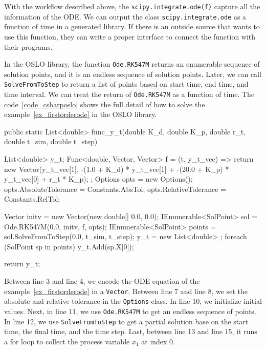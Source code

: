 With the workflow described above, the \verb|scipy.integrate.ode(f)| capture all the information of the ODE. We can output the class \verb|scipy.integrate.ode| as a function of time in a generated library. If there is an outside source that wants to use this function, they can write a proper interface to connect the function with their programs. 

In the OSLO library, the function \verb|Ode.RK547M| returns an enumerable sequence of solution points, and it is an endless sequence of solution points. Later, we can call \verb|SolveFromToStep| to return a list of points based on start time, end time, and time interval. We can treat the return of \verb|Ode.RK547M| as a function of time. The code~\ref{code_csharposlo} shows the full detail of how to solve the example~\ref{ex_firstorderode} in the OSLO library.

\begin{listing}[ht]
\begin{csharp1}
public static List<double> func_y_t(double K_d, double K_p, double r_t, double t_sim, double t_step) {
    List<double> y_t;
    Func<double, Vector, Vector> f = (t, y_t_vec) => {
        return new Vector(y_t_vec[1], -(1.0 + K_d) * y_t_vec[1] + -(20.0 + K_p) * y_t_vec[0] + r_t * K_p);
    };
    Options opts = new Options();
    opts.AbsoluteTolerance = Constants.AbsTol;
    opts.RelativeTolerance = Constants.RelTol;
    
    Vector initv = new Vector(new double[] {0.0, 0.0});
    IEnumerable<SolPoint> sol = Ode.RK547M(0.0, initv, f, opts);
    IEnumerable<SolPoint> points = sol.SolveFromToStep(0.0, t_sim, t_step);
    y_t = new List<double> {};
    foreach (SolPoint sp in points) {
        y_t.Add(sp.X[0]);
    }
    
    return y_t;
}
\end{csharp1}
\label{code_csharposlo}
\end{listing}

Between line 3 and line 4, we encode the ODE equation of the example~\ref{ex_firstorderode} in a \verb|Vector|. Between line 7 and line 8, we set the absolute and relative tolerance in the \verb|Options| class. In line 10, we initialize initial values. Next, in line 11, we use \verb|Ode.RK547M| to get an endless sequence of points. In line 12, we use \verb|SolveFromToStep| to get a partial solution base on the start time, the final time, and the time step. Last, between line 13 and line 15, it runs a for loop to collect the process variable $x_1$ at index 0.

